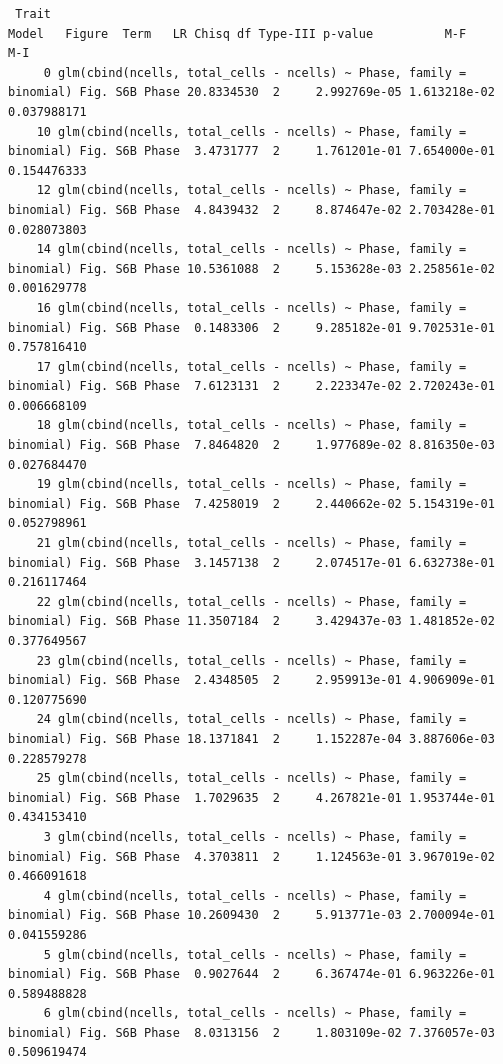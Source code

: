 \documentclass[
  landscape]{article}
\begin{document}
\begin{verbatim}
 Trait                                                               Model   Figure  Term   LR Chisq df Type-III p-value          M-F         M-I
     0 glm(cbind(ncells, total_cells - ncells) ~ Phase, family = binomial) Fig. S6B Phase 20.8334530  2     2.992769e-05 1.613218e-02 0.037988171
    10 glm(cbind(ncells, total_cells - ncells) ~ Phase, family = binomial) Fig. S6B Phase  3.4731777  2     1.761201e-01 7.654000e-01 0.154476333
    12 glm(cbind(ncells, total_cells - ncells) ~ Phase, family = binomial) Fig. S6B Phase  4.8439432  2     8.874647e-02 2.703428e-01 0.028073803
    14 glm(cbind(ncells, total_cells - ncells) ~ Phase, family = binomial) Fig. S6B Phase 10.5361088  2     5.153628e-03 2.258561e-02 0.001629778
    16 glm(cbind(ncells, total_cells - ncells) ~ Phase, family = binomial) Fig. S6B Phase  0.1483306  2     9.285182e-01 9.702531e-01 0.757816410
    17 glm(cbind(ncells, total_cells - ncells) ~ Phase, family = binomial) Fig. S6B Phase  7.6123131  2     2.223347e-02 2.720243e-01 0.006668109
    18 glm(cbind(ncells, total_cells - ncells) ~ Phase, family = binomial) Fig. S6B Phase  7.8464820  2     1.977689e-02 8.816350e-03 0.027684470
    19 glm(cbind(ncells, total_cells - ncells) ~ Phase, family = binomial) Fig. S6B Phase  7.4258019  2     2.440662e-02 5.154319e-01 0.052798961
    21 glm(cbind(ncells, total_cells - ncells) ~ Phase, family = binomial) Fig. S6B Phase  3.1457138  2     2.074517e-01 6.632738e-01 0.216117464
    22 glm(cbind(ncells, total_cells - ncells) ~ Phase, family = binomial) Fig. S6B Phase 11.3507184  2     3.429437e-03 1.481852e-02 0.377649567
    23 glm(cbind(ncells, total_cells - ncells) ~ Phase, family = binomial) Fig. S6B Phase  2.4348505  2     2.959913e-01 4.906909e-01 0.120775690
    24 glm(cbind(ncells, total_cells - ncells) ~ Phase, family = binomial) Fig. S6B Phase 18.1371841  2     1.152287e-04 3.887606e-03 0.228579278
    25 glm(cbind(ncells, total_cells - ncells) ~ Phase, family = binomial) Fig. S6B Phase  1.7029635  2     4.267821e-01 1.953744e-01 0.434153410
     3 glm(cbind(ncells, total_cells - ncells) ~ Phase, family = binomial) Fig. S6B Phase  4.3703811  2     1.124563e-01 3.967019e-02 0.466091618
     4 glm(cbind(ncells, total_cells - ncells) ~ Phase, family = binomial) Fig. S6B Phase 10.2609430  2     5.913771e-03 2.700094e-01 0.041559286
     5 glm(cbind(ncells, total_cells - ncells) ~ Phase, family = binomial) Fig. S6B Phase  0.9027644  2     6.367474e-01 6.963226e-01 0.589488828
     6 glm(cbind(ncells, total_cells - ncells) ~ Phase, family = binomial) Fig. S6B Phase  8.0313156  2     1.803109e-02 7.376057e-03 0.509619474

\end{verbatim}
\end{document}
